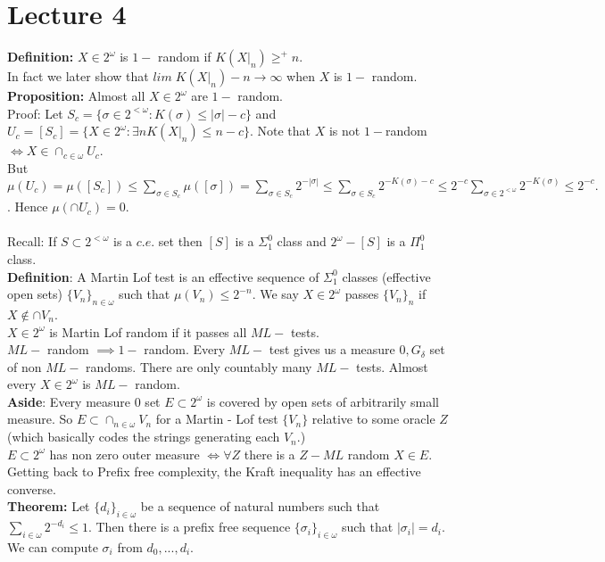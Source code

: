 \documentclass{article}
\begin{document}
	\section{Lecture 4}
	\textbf{Definition:} $X\in 2^\omega$ is $1-$ random if $K(X|_n) \geq^+ n$.\\
	In fact we later show that $lim \; K(X|_n) - n \to \infty$ when $X$ is $1-$ random.\\
	\textbf{Proposition:} Almost all $X \in 2^\omega$ are $1-$ random.\\
	Proof: Let $S_c = \{\sigma \in 2^{<\omega}: K(\sigma) \leq |\sigma| -c\}$ and $U_c = [S_c] = \{X \in 2^\omega: \exists n K(X|_n)\leq n-c\}$. Note that $X$ is not $1-$random $\iff X \in \cap_{c\in\omega} U_c$.\\
	But $\mu(U_c) = \mu([S_c]) \leq \sum_{\sigma \in S_c} \mu([\sigma]) = \sum_{\sigma \in S_c} 2^{-|\sigma|} \leq \sum_{\sigma\in S_c} 2^{-K(\sigma)-c} \leq 2^{-c} \sum_{\sigma \in 2^{<\omega} } 2^{-K(\sigma)}\leq 2^{-c}.$. Hence $\mu(\cap U_c) = 0$.\\
	\\
	Recall: If $S \subset 2^{<\omega}$ is a $c.e.$ set then $[S]$ is a $\Sigma^0_1$ class and $2^\omega - [S]$ is a $\Pi^0_1$ class.\\
	\textbf{Definition}: A Martin Lof test is an effective sequence of $\Sigma^0_1$ classes (effective open sets) $\{V_n\}_{n\in \omega}$ such that $\mu(V_n) \leq 2^{-n}$. We say $X \in 2^\omega$ passes $\{V_n\}_n$ if $X \not \in \cap V_n$. \\$X \in 2^\omega$ is Martin Lof random if it passes all $ML-$ tests.\\
	$ML-$ random $\implies 1- $ random. Every $ML-$ test gives us a measure $0, G_\delta$  set of non $ML-$ randoms. There are only countably many $ML-$ tests. Almost every $X \in 2^\omega$ is $ML-$ random.\\
	\textbf{Aside}: Every measure $0$ set $E \subset 2^\omega$ is covered by open sets of arbitrarily small measure. So $E \subset \cap_{n\in \omega} V_n$ for a Martin - Lof test $\{V_n\}$ relative to some oracle $Z$ (which basically codes the strings generating each $V_n$.)\\
	$E \subset 2^\omega$ has non zero outer measure $\iff \forall Z$ there is a $Z-ML$ random $X \in E$.\\
	Getting back to Prefix free complexity, the Kraft inequality has an effective converse.\\
	\textbf{Theorem:} Let $\{d_i\}_{i \in \omega}$ be a sequence of natural numbers such that $\sum_{i \in \omega} 2^{-d_i} \leq 1$. Then there is a prefix free sequence $\{\sigma_i\}_{i \in \omega}$ such that $|\sigma_i| = d_i$. We can compute $\sigma_i$ from $d_0,...,d_i$.\\
\end{document}
